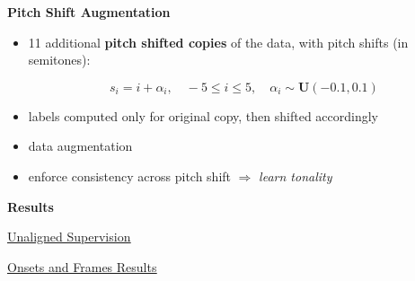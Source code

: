 \documentclass{beamer}
\newcommand{\emp}[1]{\textcolor{tum}{\textbf{#1}}}
\begin{document}
\begin{frame}[allowframebreaks]
\begin{itemize}
	\end{itemize}

	\framebreak

	\emp{Pitch Shift Augmentation}

	\begin{itemize}
		\item 11 additional \textbf{pitch shifted copies} of the data, with pitch shifts (in semitones):

		      \begin{equation*}
			      s_i = i + \alpha_i,\quad -5 \leq i \leq 5, \quad \alpha_i \sim \mathbf{U}(-0.1,0.1)
		      \end{equation*}

		\item labels computed only for original copy, then shifted accordingly
		\item data augmentation
		\item enforce consistency across pitch shift $\Rightarrow$ \textit{learn tonality}
	\end{itemize}

	\vspace{5mm}

	\emp{Results}

	\vspace{2mm}

	\href{https://benadar293.github.io/}{\underline{Unaligned Supervision}}

	\vspace{2mm}

	\href{https://storage.googleapis.com/magentadata/papers/onsets-frames/index.html}{\underline{Onsets and Frames Results}}

\end{frame}
\end{document}
